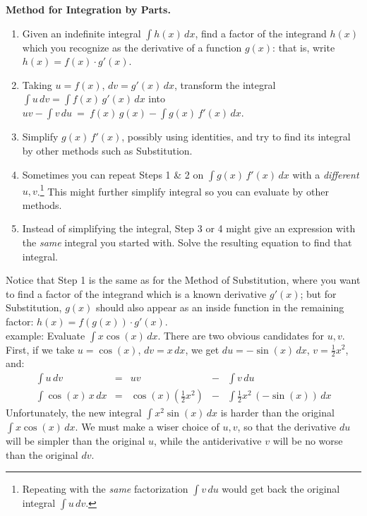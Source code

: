 \documentclass[11pt]{article}
\begin{document}
\newpage

\noindent
{\bf Method for Integration by Parts.}

\begin{enumerate}

\item Given an indefinite integral $\int\! h(x)\,dx$, find a factor of the integrand $h(x)$ which you recognize as the derivative of a function $g(x)$: that is, write $h(x)=f(x)\cdot g'(x)$.

\item Taking $u=f(x)$, $dv = g'(x)\,dx$, transform the integral $\int\! u\,dv=\int\! f(x)\, g'(x)\,dx$ into $uv-\int\! v\,du \ =\ f(x)\,g(x)-\int\! g(x)\,f'(x)\,dx$. 

\item Simplify $g(x)\,f'(x)$, possibly using identities, and try to find its integral by other methods such as Substitution.

\item Sometimes you can repeat Steps 1 \& 2 on $\int\! g(x)\,f'(x)\,dx$  
with a \emph{different} $u,v$.\footnote{
Repeating with the {\it same} factorization $\int\! v\,du$ would
get back the original integral $\int\! u\,dv$.
}
This might further simplify integral so you can evaluate by other methods.

\item Instead of simplifying the integral, Step 3 or 4 might give an expression with the {\it same} integral you started with. Solve the resulting equation to find that integral.

\end{enumerate}
%
Notice that Step 1 is the same as for the Method of Substitution, where you want to find a factor of the integrand which is a known derivative $g'(x)$; but for Substitution, $g(x)$ should also appear as an inside function in the remaining factor: $h(x)=f(g(x))\cdot g'(x)$.
\\[1em]
{\sc example:} Evaluate $\int x\cos(x)\,dx$. There are two obvious candidates for $u,v$. 
First, if we take $u=\cos(x)$, $dv=x\,dx$, we get $du=-\sin(x)\,dx$, $v = \frac12 x^2$, and:
$$\begin{array}{ccccc}
\int u\,dv & = & uv & - & \int v\,du 
\\[.5em]
\int \cos(x)\,x\,dx & = & \cos(x)\left(\tfrac 12 x^2\right) & - & \int \tfrac12 x^2\,(-\sin(x))\,dx
\end{array}$$
Unfortunately, the new integral $\int\! x^2\sin(x)\,dx$ is harder than the original $\int\! x\cos(x)\,dx$. We must make a wiser choice of $u,v$, so that the derivative $du$ will be simpler than the original $u$, while the antiderivative $v$ will be no worse than the original $dv$.
\end{document}
